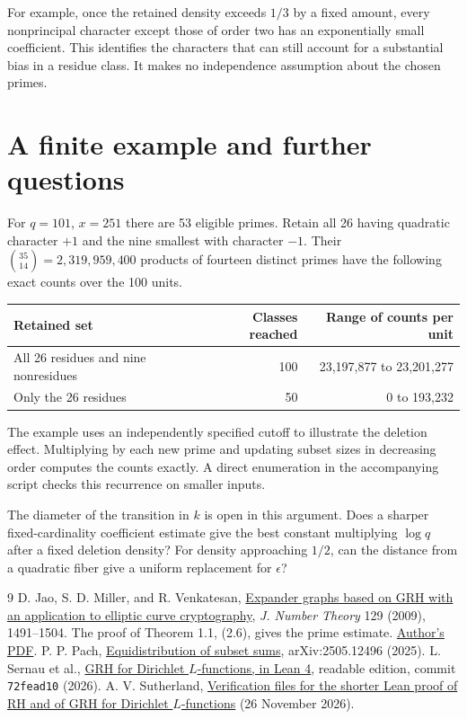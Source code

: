 \documentclass[11pt]{article}
\theoremstyle{remark}\newtheorem*{remark}{Remark}
\begin{document}
For example, once the retained density exceeds $1/3$ by a fixed amount, every nonprincipal character except those of order two has an exponentially small coefficient. This identifies the characters that can still account for a substantial bias in a residue class. It makes no independence assumption about the chosen primes.

\clearpage
\section{A finite example and further questions}
For $q=101$, $x=251$ there are 53 eligible primes. Retain all 26 having quadratic character $+1$ and the nine smallest with character $-1$. Their $\binom{35}{14}=2{,}319{,}959{,}400$ products of fourteen distinct primes have the following exact counts over the 100 units.
\begin{center}
\begin{tabular}{lrr}\toprule
Retained set & Classes reached & Range of counts per unit\\\midrule
All 26 residues and nine nonresidues &100&23,197,877 to 23,201,277\\
Only the 26 residues &50&0 to 193,232\\\bottomrule
\end{tabular}
\end{center}
The example uses an independently specified cutoff to illustrate the deletion effect. Multiplying by each new prime and updating subset sizes in decreasing order computes the counts exactly. A direct enumeration in the accompanying script checks this recurrence on smaller inputs.

The diameter of the transition in $k$ is open in this argument. Does a sharper fixed-cardinality coefficient estimate give the best constant multiplying $\log q$ after a fixed deletion density? For density approaching $1/2$, can the distance from a quadratic fiber give a uniform replacement for $\epsilon$?

\begin{thebibliography}{9}
 D. Jao, S. D. Miller, and R. Venkatesan, \href{https://doi.org/10.1016/j.jnt.2008.11.006}{Expander graphs based on GRH with an application to elliptic curve cryptography}, \emph{J. Number Theory} 129 (2009), 1491--1504. The proof of Theorem 1.1, (2.6), gives the prime estimate. \href{https://web.williams.edu/Mathematics/sjmiller/public_html/crypto/handouts/JaoMillerVenkatesan_ExpanderGraphsGRHEllCurveCrypto.pdf}{Author's PDF}.
 P. P. Pach, \href{https://arxiv.org/abs/2505.12496}{Equidistribution of subset sums}, arXiv:2505.12496 (2025).
 L. Sernau et al., \href{https://github.com/lsernau/grh-lean/blob/72fead102f663d5c7a407964a13dc0cf9d977207/grh/src/Main.lean}{GRH for Dirichlet $L$-functions, in Lean 4}, readable edition, commit \texttt{72fead10} (2026).
 A. V. Sutherland, \href{https://math.mit.edu/~drew/shortgrh/}{Verification files for the shorter Lean proof of RH and of GRH for Dirichlet $L$-functions} (26 November 2026).
\end{thebibliography}
\end{document}
